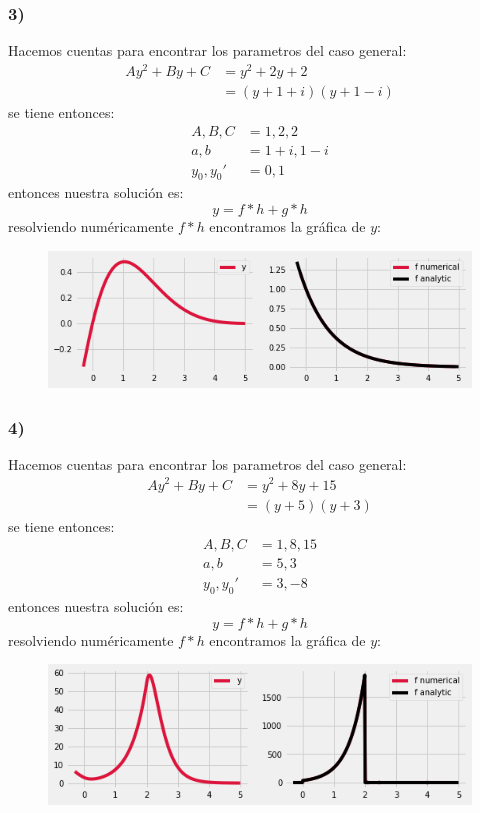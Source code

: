 \documentclass{article}
\begin{document}
\begin{tcolorbox}
    \subsubsection*{3)}
    Hacemos cuentas para encontrar los parametros del caso general:
    \begin{align*}
        Ay^2 + By + C 
        &= y^2 + 2y + 2 \\
        &= (y+1+i)(y+1-i)
    \end{align*}
    se tiene entonces:
    \begin{align*}
        A, B, C &= 1, 2, 2 \\ 
        a,b &= 1+i, 1-i \\  
        y_0, y_0' &= 0,1
    \end{align*}    
    entonces nuestra solución es:
    \[ y = f*h + g*h \]
    resolviendo numéricamente $f*h$ encontramos la gráfica de $y$:
    \begin{figure}[H]
        \centering
        \includegraphics[scale=0.7]{images/p1_3.png}
    \end{figure}

    \subsubsection*{4)}
    Hacemos cuentas para encontrar los parametros del caso general:
    \begin{align*}
        Ay^2 + By + C 
        &= y^2 + 8y + 15 \\
        &= (y+5)(y+3)
    \end{align*}
    se tiene entonces:
    \begin{align*}
        A, B, C &= 1,8,15 \\
        a,b &= 5,3 \\ 
        y_0, y_0' &= 3,-8
    \end{align*}
    entonces nuestra solución es:
    \[ y = f*h + g*h \]
    resolviendo numéricamente $f*h$ encontramos la gráfica de $y$:
    \begin{figure}[H]
        \centering
        \includegraphics[scale=0.7]{images/p1_4.png}
    \end{figure}

\end{tcolorbox}
\end{document}
